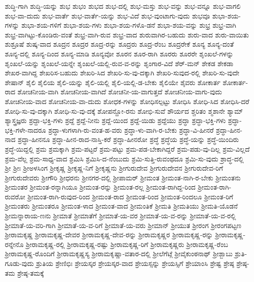 {ಶುದ್ಧಿ-ಗಾಗಿ
ಶುದ್ಧಿ-ಯನ್ನು
ಶುಭ
ಶುಭಂ
ಶುಭದ
ಶುಭ-ದಲ್ಲಿ
ಶುಭ-ಮಸ್ತು
ಶುಭ-ವನ್ನು
ಶುಭ-ವನ್ನೂ
ಶುಭ-ವಾಗಲಿ
ಶುಭ-ವಾ-ದುದು
ಶುಭ-ವಾರ್ತೆ
ಶುಭ-ವಾರ್ತೆ-ಯನ್ನು
ಶುಭ-ವಿದೆ
ಶುಭ-ವುಂಟಾಗು-ವುದು
ಶುಭವೂ
ಶುಭಾ-ಶಯ-ಗಳನ್ನು
ಶುಭಾ-ಶಯ-ಗಳಿಗೆ
ಶುಭಾ-ಶಯ-ಗಳು
ಶುಭಾ-ಶಯ-ಗಳೊ-ಡನೆ
ಶುಭಾ-ಶಯ-ವನ್ನು
ಶುಭ್ರ
ಶುಭ್ರ-ವಾಗಿ
ಶುಭ್ರ-ವಾಗಿಟ್ಟು-ಕೊಂಡಿರು-ವಂತೆ
ಶುಭ್ರ-ವಾಗಿ-ರುವ
ಶುಭ್ರ-ವಾದ
ಶುರುವಾಗಿರ-ಬಹುದು
ಶುರು-ವಾದ
ಶುರು-ವಾಯಿತು
ಶುಶ್ರೂಷೆ
ಶುಷ್ಕ-ವಾದ
ಶೂದ್ರನ
ಶೂದ್ರರ
ಶೂದ್ರ-ರನ್ನು
ಶೂದ್ರರು
ಶೂದ್ರ-ರೆಂಬ
ಶೂದ್ರರೇಕೆ
ಶೂನ್ಯ
ಶೂನ್ಯ-ದಂತೆ
ಶೂನ್ಯ-ದಲ್ಲಿ
ಶೂನ್ಯ-ದಿಂದ
ಶೂನ್ಯ-ಮಾಡಿ
ಶೂನ್ಯವೋ
ಶೂರನ
ಶೂರ-ರಾಗಿ
ಶೂರರು
ಶೂರರೇ
ಶೃಂಖಲೆ-ಗಳನ್ನು
ಶೃಂಖಲೆ-ಯನ್ನು
ಶೃಂಖಲೆ-ಯನ್ನೇ
ಶೃಂಖಲೆ-ಯಲ್ಲಿ-ರುವ-ವ-ರನ್ನು
ಶೃಂಗಾರ-ವಿದೆ
ಶೆರ್-ಮನ್
ಶೇಕಡ
ಶೇಕಡಾ
ಶೇಖರ-ವಾಗಿದ್ದ
ಶೇಖರಿಸ-ಬಹುದು
ಶೇಖರಿ-ಸಿದ
ಶೇಖರಿ-ಸು-ವು-ದಕ್ಕಾಗಿ
ಶೇಖರಿ-ಸುವುದ-ರಲ್ಲಿ
ಶೇಖರಿ-ಸು-ವುದೇ
ಶೇಷಾನ್
ಶೈಲಿ
ಶೈಲಿಯ
ಶೈಲಿ-ಯನ್ನು
ಶೈಲಿ-ಯಲ್ಲಿ
ಶೈಲಿ-ಯಲ್ಲಿ-ಡ-ಬೇಕು
ಶೈಲಿಯೇ
ಶೈವರು
ಶೋಕಾರ್ತ
ಶೋಕಾರ್ತ-ರಾದ
ಶೋಚನೀಯ-ವಾಗಿ
ಶೋಚನೀಯ-ವಾಗಿದೆ
ಶೋಚನೀ-ಯ-ವಾಗುತ್ತದೆ
ಶೋಚನೀಯ-ವಾಗು-ವುದು
ಶೋಚನೀಯ-ವಾದ
ಶೋಚನೀಯ-ವಾ-ದುದು
ಶೋಧಕ-ಗಳನ್ನು
ಶೋಧಿಸಲ್ಪಟ್ಟು
ಶೋಧಿಸಿ
ಶೋಧಿ-ಸಿದ
ಶೋಧಿಸಿ-ದರೆ
ಶೋಧಿ-ಸು-ವು-ದಕ್ಕಾಗಿ
ಶೋಧಿ-ಸು-ವು-ದಕ್ಕೆ
ಶೋಪನ್ಹೋ-ರನು
ಶೋಭಿ-ಸುವೆ
ಶೌರ್ಯದ
ಶ್ಚರಿತಂ
ಶ್ಮಶಾನೇ
ಶ್ಯಾಮ್
ಶ್ಯಾಸ್ತ್ರಜ್ಞರು
ಶ್ರದ್ದಾ-ಭಕ್ತಿ-ಗಳು
ಶ್ರದ್ದೆ
ಶ್ರದ್ದೆ-ನೀನು
ಶ್ರದ್ದೆ-ಯಿಂದ
ಶ್ರದ್ದೆ-ಯಿಡು
ಶ್ರದ್ದೆಯು
ಶ್ರದ್ಧಾ
ಶ್ರದ್ಧಾ-ಭಕ್ತಿ-ಗಳು
ಶ್ರದ್ಧಾ-ಭಕ್ತಿ-ಗಳೇ-ನಾದರೂ
ಶ್ರದ್ಧಾ-ಳುಗಳಾಗಿ-ರು-ವಂತ-ಹ-ವರು
ಶ್ರದ್ಧಾ-ಳು-ವಾಗಿ-ರ-ಬೇಕು
ಶ್ರದ್ಧಾ-ವಿ-ಹೀನರೆ
ಶ್ರದ್ಧಾ-ಹೀನ-ನಾದ
ಶ್ರದ್ಧಾ-ಹೀನನೂ
ಶ್ರದ್ಧಾ-ಹೀನ-ರಾದ-ನಾಸ್ತಿ-ಕರೆ
ಶ್ರದ್ಧಾ-ಹೀನರೋ
ಶ್ರದ್ಧೆ
ಶ್ರದ್ಧೆಯ
ಶ್ರದ್ಧೆ-ಯನ್ನು
ಶ್ರದ್ಧೆ-ಯಿಂದಿರು
ಶ್ರದ್ಧೆ-ಯಿದ್ದಲ್ಲಿ
ಶ್ರಮ
ಶ್ರಮಕ್ಕಾಗಿ
ಶ್ರಮ-ಪಟ್ಟರೆ
ಶ್ರಮ-ಪಟ್ಟು
ಶ್ರಮ-ಪಡ-ಬೇಕಾಗಿದ್ದರೆ
ಶ್ರಮ-ಪಡು-ವು-ದಿಲ್ಲ
ಶ್ರಮ-ವಿಲ್ಲದೆ
ಶ್ರಮ-ವೆಲ್ಲ
ಶ್ರಮ-ಸಾಧ್ಯ-ವಾದ
ಶ್ರಮಿಸಿ
ಶ್ರಮಿಸಿ-ದ-ನೆಂಬುದು
ಶ್ರಮಿ-ಸುತ್ತಿ-ರುವಂಥದೂ
ಶ್ರಮಿ-ಸು-ವುದು
ಶ್ರಾದ್ಧ-ದಲ್ಲಿ
ಶ್ರೀ
ಶ್ರೀಃ
ಶ್ರೀಅಳಸಿಂಗ
ಶ್ರೀಕೃಷ್ಣ
ಶ್ರೀಕೃಷ್ಣ-ನಿಗೆ
ಶ್ರೀಕೃಷ್ಣನು
ಶ್ರೀಗುರುದೇವ
ಶ್ರೀಗುರುದೇವನ
ಶ್ರೀಗುರುದೇವ-ರಿಗೆ
ಶ್ರೀಗುರುದೇವರು
ಶ್ರೀಗೌರಿ
ಶ್ರೀಧರನು
ಶ್ರೀನಗರ-ದಲ್ಲಿ
ಶ್ರೀಪಾಮರ್
ಶ್ರೀಮಂತ
ಶ್ರೀಮಂತ-ನಾಗಿ-ರ-ಬೇಕು
ಶ್ರೀಮಂತನು
ಶ್ರೀಮಂತರ
ಶ್ರೀಮಂತ-ರನ್ನಾಗಿಯೂ
ಶ್ರೀಮಂತ-ರನ್ನು
ಶ್ರೀಮಂತ-ರಲ್ಲ
ಶ್ರೀಮಂತ-ರಾಗಿದ್ದ-ರಿಂದ
ಶ್ರೀಮಂತ-ರಾಗಿ-ರುವರೋ
ಶ್ರೀಮಂತ-ರಾಗಿ-ರುವುದ-ರಿಂದ
ಶ್ರೀಮಂತ-ರಾದ
ಶ್ರೀಮಂತ-ರಿಂದ
ಶ್ರೀಮಂತ-ರಿಂದಲೂ
ಶ್ರೀಮಂತ-ರಿಗೆ
ಶ್ರೀಮಂತರು
ಶ್ರೀಮಂತರೂ
ಶ್ರೀಮಂತ-ಳಾದ
ಶ್ರೀಮಂತ-ವಾದ
ಶ್ರೀಮಂತಿಕೆ
ಶ್ರೀಮತಿ
ಶ್ರೀಮತಿಯು
ಶ್ರೀಮತಿ-ಯೊಡನೆ
ಶ್ರೀಮನ್ನಾರಾಯ-ಣನು
ಶ್ರೀಮಾತೆ
ಶ್ರೀಮಾತೆಗೆ
ಶ್ರೀಮಾತೆ-ಯ-ವರ
ಶ್ರೀಮಾತೆ-ಯ-ವ-ರನ್ನು
ಶ್ರೀಮಾತೆ-ಯ-ವ-ರಲ್ಲಿ
ಶ್ರೀಮಾತೆ-ಯ-ವರಿ-ಗಾಗಿ
ಶ್ರೀಮಾತೆ-ಯ-ವ-ರಿಗೆ
ಶ್ರೀಮಾತೆ-ಯ-ವರು
ಶ್ರೀಮಾನ್
ಶ್ರೀಯುತ
ಶ್ರೀರಂಗ
ಶ್ರೀರಂಗಪಟ್ಟಣ
ಶ್ರೀರಾಮಕೃಷ್ಣ
ಶ್ರೀರಾಮಕೃಷ್ಣ-ದೇವರ
ಶ್ರೀರಾಮಕೃಷ್ಣ-ದೇವ-ರನ್ನು
ಶ್ರೀರಾಮಕೃಷ್ಣರ
ಶ್ರೀರಾಮಕೃಷ್ಣ-ರನ್ನು
ಶ್ರೀರಾಮಕೃಷ್ಣ-ರನ್ನೇನೊ
ಶ್ರೀರಾಮಕೃಷ್ಣ-ರಲ್ಲಿ
ಶ್ರೀರಾಮಕೃಷ್ಣ-ರಷ್ಟು
ಶ್ರೀರಾಮಕೃಷ್ಣ-ರಿಗೆ
ಶ್ರೀರಾಮಕೃಷ್ಣರು
ಶ್ರೀರಾಮಕೃಷ್ಣ-ರೆಂಬ
ಶ್ರೀರಾಮಕೃಷ್ಣ-ರೊಂದಿಗೆ
ಶ್ರೀರಾಮಕೃಷ್ಣಸ್ಯ
ಶ್ರೀರಾಮಕೃಷ್ಣಾ-ವತಾರ-ದಲ್ಲಿ
ಶ್ರೀಲೆಗೆಟ್ಗೆ
ಶ್ರೀವೈಕುಂಠನಾಥ್
ಶ್ರೀಶ್ಬಾಬು
ಶ್ರುತಿ-ಗೂಡು-ವುದು
ಶ್ರುತಿಯ
ಶ್ರೇಣಿಭಿಃ
ಶ್ರೇಯಸ್ಕರ
ಶ್ರೇಯಸ್ಕರ-ವಾದ
ಶ್ರೇಯಸ್ಸನ್ನು
ಶ್ರೇಯಸ್ಸಿಗೆ
ಶ್ರೇಯಾಂಸಿ
ಶ್ರೇಷ್ಟ
ಶ್ರೇಷ್ಠ
ಶ್ರೇಷ್ಠ-ತಮ
ಶ್ರೇಷ್ಠ-ತಮಕ್ಕೆ
}
